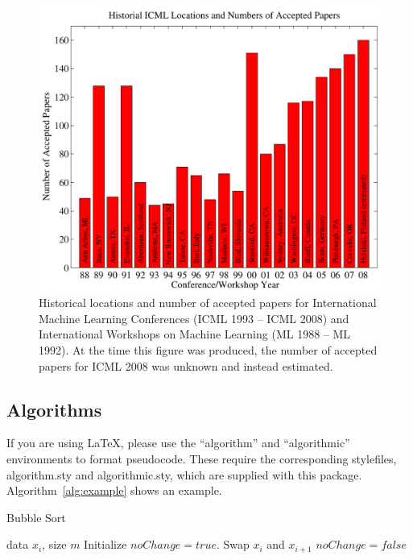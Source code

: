 \documentclass{article}
\begin{document}
\begin{figure}[ht]
\vskip 0.2in
\begin{center}
\centerline{\includegraphics[width=\columnwidth]{figs/examplegraph}}
\caption{Historical locations and number of accepted papers for International
  Machine Learning Conferences (ICML 1993 -- ICML 2008) and
  International Workshops on Machine Learning (ML 1988 -- ML
  1992). At the time this figure was produced, the number of
  accepted papers for ICML 2008 was unknown and instead estimated.}
\label{icml-historical}
\end{center}
\vskip -0.2in
\end{figure} 

\subsection{Algorithms}

If you are using \LaTeX, please use the ``algorithm'' and ``algorithmic'' 
environments to format pseudocode. These require 
the corresponding stylefiles, algorithm.sty and 
algorithmic.sty, which are supplied with this package. 
Algorithm~\ref{alg:example} shows an example. 

\begin{algorithm}[tb]
   \caption{Bubble Sort}
   \label{alg:example}
\begin{algorithmic}
    data $x_i$, size $m$
   \REPEAT
   \STATE Initialize $noChange = true$.
   \STATE Swap $x_i$ and $x_{i+1}$
   \STATE $noChange = false$
   \ENDIF
   \ENDFOR
\end{algorithmic}
\end{algorithm}
 
\end{document}
